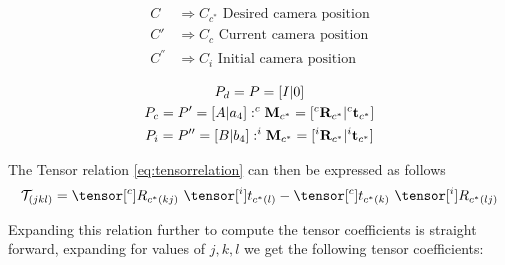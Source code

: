\begin{align*}
  C &\Rightarrow C_{c^*} \text{  Desired camera position} \\
  C' &\Rightarrow C_c \text{  Current camera position} \\
  C^{''} &\Rightarrow C_i \text{  Initial camera position} \\
\end{align*}
\begin{gather*}
  P_d = P = [I | 0]\\
  P_c = P^{\prime} = [A | a_4] : ^{c}{\bf M}_{c^*} = [ ^{c}{\bf R}_{c^*} | ^{c}{\bf t}_{c^*} ]\\
  P_i = P^{\prime \prime} = [B | b_4] : ^{i}{\bf M}_{c^*} = [ ^{i}{\bf R}_{c^*} | ^{i}{\bf t}_{c^*} ]
\end{gather*}

The Tensor relation \eqref{eq:tensorrelation} can then be expressed as follows
\begin{equation}
\mathcal{T}_{(jkl)} = \tensor[^{c}]{R}{_{c^{*}(kj)}} \ \tensor[^{i}]{t}{_{c^{*}(l)}} - \tensor[^{c}]{t}{_{c^{*}(k)}} \ \tensor[^{i}]{R}{_{c^{*}(lj)}} \label{eq:tensorcoeffs}
\end{equation}

Expanding this relation further to compute the tensor coefficients is straight forward, expanding for values of $j,k,l$ we get the following tensor coefficients:


